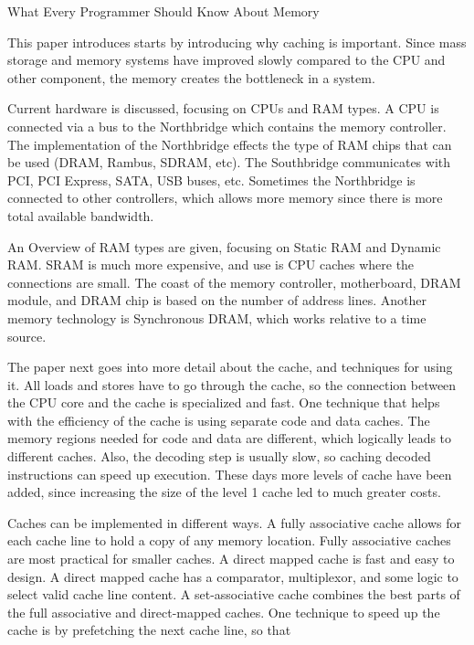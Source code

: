 \documentclass[letterpaper,12pt,titlepage]{article}
\begin{document}
\centerline{\large What Every Programmer Should Know About Memory}

This paper introduces starts by introducing why caching is important.  Since mass storage and memory systems have improved slowly compared
to the CPU and other component, the memory creates the bottleneck in a system.
\newline
\par
Current hardware is discussed, focusing on CPUs and RAM types.  A CPU is connected via a bus to the Northbridge which contains the memory controller.
The implementation of the Northbridge effects the type of RAM chips that can be used (DRAM, Rambus, SDRAM, etc).  The Southbridge communicates with
PCI, PCI Express, SATA, USB buses, etc.  Sometimes the Northbridge is connected to other controllers, which allows more memory since there is more
total available bandwidth.
\newline
\par
An Overview of RAM types are given, focusing on Static RAM and Dynamic RAM.  SRAM is much more expensive, and use is CPU caches where the connections
are small.  The coast of the memory controller, motherboard, DRAM module, and DRAM chip is based on the number of address lines.  Another memory technology
is Synchronous DRAM, which works relative to a time source.
\newline
\par
The paper next goes into more detail about the cache, and techniques for using it.  All loads and stores have to go through the cache, so the connection
between the CPU core and the cache is specialized and fast.  One technique that helps with the efficiency of the cache is using separate code and data caches.
The memory regions needed for code and data are different, which logically leads to different caches.  Also, the decoding step is usually slow, so 
caching decoded instructions can speed up execution.  These days more levels of cache have been added, since increasing the size of the level 1 cache
led to much greater costs.
\newline
\par
Caches can be implemented in different ways.  A fully associative cache allows for each cache line to hold a copy of any memory location.
Fully associative caches are most practical for smaller caches.  A direct mapped cache is fast and easy to design.  A direct mapped cache
has a comparator, multiplexor, and some logic to select valid cache line content.  A set-associative cache combines the best parts of
the full associative and direct-mapped caches.  One technique to speed up the cache is by prefetching the next cache line, so that
\end{document}
